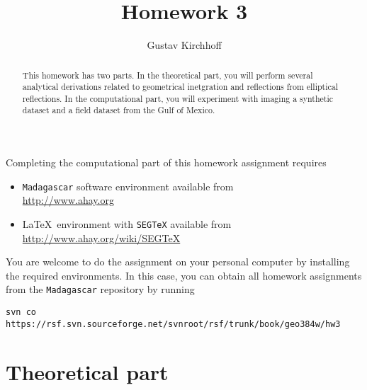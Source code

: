 \author{Gustav Kirchhoff} 
\title{Homework 3}

\begin{abstract}
  This homework has two parts. In the theoretical part, you will
  perform several analytical derivations related to 
  geometrical inetgration and reflections from elliptical reflections. In the
  computational part, you will experiment with imaging a synthetic
  dataset and a field dataset from the Gulf of Mexico.
\end{abstract}

Completing the computational part of this homework assignment requires
\begin{itemize}
\item \texttt{Madagascar} software environment available from \\
  \url{http://www.ahay.org}
\item \LaTeX\ environment with \texttt{SEGTeX} available from \\ 
  \url{http://www.ahay.org/wiki/SEGTeX}
\end{itemize}

You are welcome to do the assignment on your personal computer by
installing the required environments. In this case, you can obtain all
homework assignments from the \texttt{Madagascar} repository by running
\begin{verbatim}
svn co https://rsf.svn.sourceforge.net/svnroot/rsf/trunk/book/geo384w/hw3 
\end{verbatim}

\section{Theoretical part}

